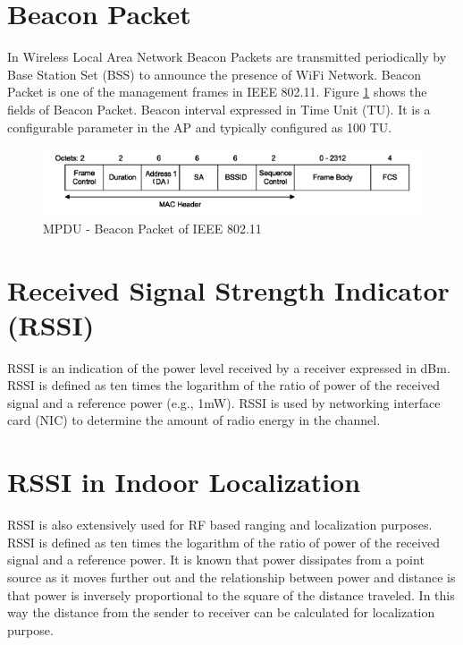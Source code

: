 \documentclass[11pt,a4paper,headinclude,footinclude,chapterprefix=on]{scrreprt}
\begin{document}
\section{Beacon Packet} In Wireless Local Area Network Beacon Packets are transmitted periodically by Base Station Set (BSS) to announce the presence of WiFi Network. Beacon Packet is one of the management frames in IEEE 802.11. Figure \ref {fig:beacon} shows the fields of Beacon Packet. Beacon interval expressed in Time Unit (TU). It is a configurable parameter in the AP and typically configured as 100 TU. 
\begin{figure}
	[!h] \centering 
	\includegraphics[width=15cm]{Images/beacon_frame.png} \caption{MPDU - Beacon Packet of IEEE 802.11} \label{fig:beacon} 
\end{figure}

\section{Received Signal Strength Indicator (RSSI)} RSSI is an indication of the power level received by a receiver expressed in dBm. RSSI is defined as ten times the logarithm of the ratio of power of the received signal and a reference power (e.g., 1mW). RSSI is used by networking interface card (NIC) to determine the amount of radio energy in the channel.


\section{RSSI in Indoor Localization} RSSI is also extensively used for RF based ranging and localization purposes. RSSI is defined as ten times the logarithm of the ratio of power of the received signal and a reference power. It is known that power dissipates from a point source as it moves further out and the relationship between power and distance is that power is inversely proportional to the square of the distance traveled. In this way the distance from the sender to receiver can be calculated for localization purpose.
\end{document}
